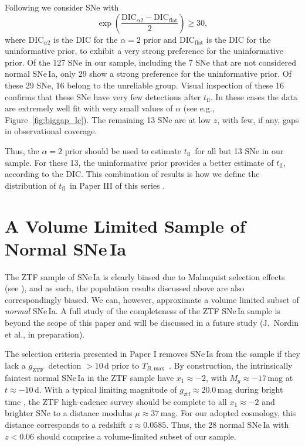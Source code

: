 \documentclass[twocolumn]{./aastex63}
\newcommand{\gztf}{$g_\mathrm{ZTF}$}
\newcommand{\tfl}{$t_\mathrm{fl}$}
\newcommand{\tbmax}{$T_{B,\mathrm{max}}$}
\begin{document}
Following \citet{Jeffreys61} we consider SNe with
%
$$\exp\left(\frac{\mathrm{DIC}_{\alpha2} - \mathrm{DIC}_\mathrm{flat}}{2}\right) \ge 30,$$
%
where $\mathrm{DIC}_{\alpha2}$ is the DIC for the $\alpha = 2$ prior and
$\mathrm{DIC}_\mathrm{flat}$ is the DIC for the uninformative prior, to
exhibit a very strong preference for the uninformative prior. Of the 127 SNe
in our sample, including the 7 SNe that are not considered normal SNe\,Ia, only
29 show a strong preference for the uninformative prior. Of these 29 SNe, 16
belong to the unreliable group. Visual inspection of these 16 confirms that
these SNe have very few detections after \tfl. In these cases the data are
extremely well fit with very small values of $\alpha$ (see e.g.,
Figure~\ref{fig:biggap_lc}). The remaining 13 SNe are at low $z$, with few, if
any, gaps in observational coverage.

Thus, the $\alpha = 2$ prior should be used to estimate \tfl\ for all but 13
SNe in our sample. For these 13, the uninformative prior provides a better
estimate of \tfl, according to the DIC. This combination of results is how we
define the distribution of \tfl\ in Paper III of this series \citep{Bulla20}.

\section{A Volume Limited Sample of Normal SNe\,Ia}\label{sec:volume_limited}

The ZTF sample of SNe\,Ia is clearly biased due to Malmquist selection effects
(see \citealt{Yao19}), and as such, the population results discussed above are
also correspondingly biased. We can, however, approximate a volume limited
subset of \textit{normal} SNe\,Ia. A full study of the completeness of the ZTF
SNe\,Ia sample is beyond the scope of this paper and will be discussed in a
future study (J.~Nordin et al., in preparation).

The selection criteria presented in Paper I removes SNe\,Ia from the sample if
they lack a \gztf\ detection $> 10$\,d prior to \tbmax\ \citep{Yao19}. By
construction, the intrinsically faintest normal SNe\,Ia in the ZTF sample have
$x_1 \approx -2$, with $M_g \approx -17$\,mag at $t \approx -10$\,d. With a
typical limiting magnitude of $g_\mathrm{ztf} \approx 20.0$\,mag during bright
time \citep{Bellm19}, the ZTF high-cadence survey should be complete to all
$x_1 \approx -2$ and brighter SNe to a distance modulus $\mu \approx 37$\,mag.
For our adopted cosmology, this distance corresponds to a redshift $z \approx
0.0585$. Thus, the 28 normal SNe\,Ia with $z < 0.06$ should comprise a
volume-limited subset of our sample.
\end{document}
